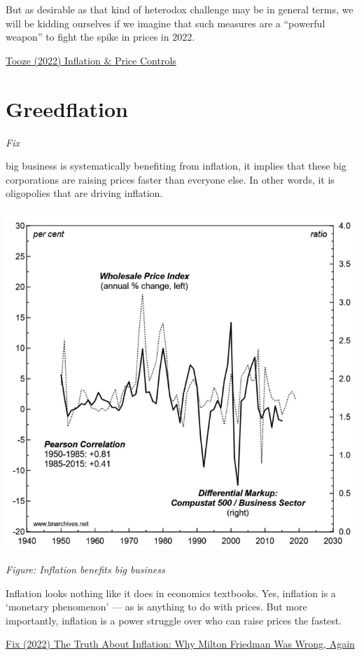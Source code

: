 \documentclass[
]{book}
\begin{document}
But as desirable as that kind of heterodox challenge may be in general terms, we will be kidding ourselves if we imagine that such measures are a ``powerful weapon'' to fight the spike in prices in 2022.

\href{https://adamtooze.substack.com/p/top-links-65-inflation-and-price}{Tooze (2022) Inflation \& Price Controls}

\hypertarget{greedflation}{%
\section{Greedflation}\label{greedflation}}

\emph{Fix}

big business is systematically benefiting from inflation, it implies that these big corporations are raising prices faster than everyone else. In other words, it is oligopolies that are driving inflation.

\includegraphics{fig/bn_inflation_markup_crop.png}

\emph{Figure: Inflation benefits big business}

Inflation looks nothing like it does in economics textbooks. Yes, inflation is a `monetary phenomenon' --- as is anything to do with prices. But more importantly, inflation is a power struggle over who can raise prices the fastest.

\href{https://evonomics.com/the-truth-about-inflation-why-milton-friedman-was-wrong-again/}{Fix (2022) The Truth About Inflation: Why Milton Friedman Was Wrong, Again}
\end{document}
